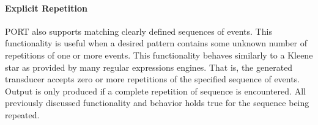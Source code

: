 \paragraph{Explicit Repetition}
PORT also supports matching clearly defined sequences of events.  This functionality is useful when a desired pattern
contains some unknown number of repetitions of one or more events.
This functionality behaves similarly to a Kleene star as provided by many regular expressions engines.
That is, the generated transducer accepts zero or more repetitions of the specified sequence of events.
Output is only produced if a complete repetition of sequence is encountered.
All previously discussed functionality and behavior holds true for the sequence being repeated.

%
%
%
%
%
%
%
%
%
%
